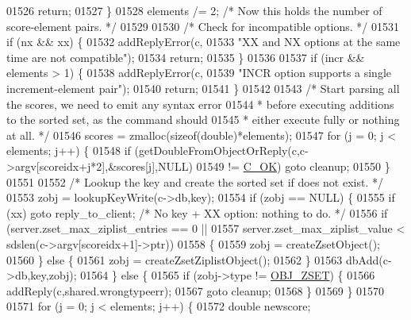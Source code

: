 \begin{DoxyCode}
01526         \textcolor{keywordflow}{return};
01527     \}
01528     elements /= 2; \textcolor{comment}{/* Now this holds the number of score-element pairs. */}
01529 
01530     \textcolor{comment}{/* Check for incompatible options. */}
01531     \textcolor{keywordflow}{if} (nx && xx) \{
01532         addReplyError(c,
01533             \textcolor{stringliteral}{"XX and NX options at the same time are not compatible"});
01534         \textcolor{keywordflow}{return};
01535     \}
01536 
01537     \textcolor{keywordflow}{if} (incr && elements > 1) \{
01538         addReplyError(c,
01539             \textcolor{stringliteral}{"INCR option supports a single increment-element pair"});
01540         \textcolor{keywordflow}{return};
01541     \}
01542 
01543     \textcolor{comment}{/* Start parsing all the scores, we need to emit any syntax error}
01544 \textcolor{comment}{     * before executing additions to the sorted set, as the command should}
01545 \textcolor{comment}{     * either execute fully or nothing at all. */}
01546     scores = zmalloc(\textcolor{keyword}{sizeof}(\textcolor{keywordtype}{double})*elements);
01547     \textcolor{keywordflow}{for} (j = 0; j < elements; j++) \{
01548         \textcolor{keywordflow}{if} (getDoubleFromObjectOrReply(c,c->argv[scoreidx+j*2],&scores[j],NULL)
01549             != \hyperlink{server_8h_a303769ef1065076e68731584e758d3e1}{C\_OK}) \textcolor{keywordflow}{goto} cleanup;
01550     \}
01551 
01552     \textcolor{comment}{/* Lookup the key and create the sorted set if does not exist. */}
01553     zobj = lookupKeyWrite(c->db,key);
01554     \textcolor{keywordflow}{if} (zobj == NULL) \{
01555         \textcolor{keywordflow}{if} (xx) \textcolor{keywordflow}{goto} reply\_to\_client; \textcolor{comment}{/* No key + XX option: nothing to do. */}
01556         \textcolor{keywordflow}{if} (server.zset\_max\_ziplist\_entries == 0 ||
01557             server.zset\_max\_ziplist\_value < sdslen(c->argv[scoreidx+1]->ptr))
01558         \{
01559             zobj = createZsetObject();
01560         \} \textcolor{keywordflow}{else} \{
01561             zobj = createZsetZiplistObject();
01562         \}
01563         dbAdd(c->db,key,zobj);
01564     \} \textcolor{keywordflow}{else} \{
01565         \textcolor{keywordflow}{if} (zobj->type != \hyperlink{server_8h_a8c356422ddbc03bd77694880a30a1953}{OBJ\_ZSET}) \{
01566             addReply(c,shared.wrongtypeerr);
01567             \textcolor{keywordflow}{goto} cleanup;
01568         \}
01569     \}
01570 
01571     \textcolor{keywordflow}{for} (j = 0; j < elements; j++) \{
01572         \textcolor{keywordtype}{double} newscore;

\end{DoxyCode}
